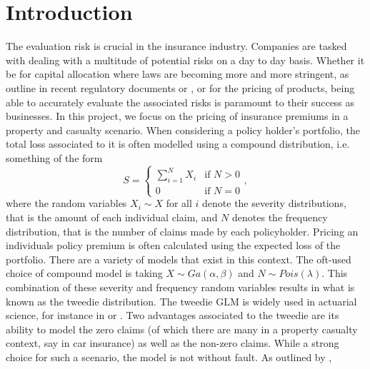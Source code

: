 \documentclass{article}
\numberwithin{equation}{section}
\begin{document}
\section{Introduction}
The evaluation risk is crucial in the insurance industry. Companies are tasked with dealing with a multitude of potential risks on a day to day basis. Whether it be for capital allocation where laws are becoming more and more stringent, as outline in recent regulatory documents   or \cite{OSFI2015}, or for the pricing of products, being able to accurately evaluate the associated risks is paramount to their success as businesses. In this project, we focus on the pricing of insurance premiums in a property and casualty scenario. When considering a policy holder's portfolio, the total loss associated to it is often modelled using a compound distribution, i.e. something of the form
$$
S=\left\{\begin{array}{ll}\sum_{i=1}^NX_i & \text{if }N>0\\0 & \text{if }N=0\end{array}\right.,
$$
where the random variables $X_i\sim X$ for all $i$ denote the severity distributions, that is the amount of each individual claim, and $N$ denotes the frequency distribution, that is the number of claims made by each policyholder. Pricing an individuals policy premium is often calculated using the expected loss of the portfolio. There are a variety of models that exist in this context. The oft-used choice of compound model is taking $X\sim Ga(\alpha,\beta)$ and $N\sim Pois(\lambda)$. This combination of these severity and frequency random variables results in what is known as the tweedie distribution. The tweedie GLM is widely used in actuarial science, for instance in \cite{murphy2000using} or \cite{peters2008model}. Two advantages associated to the tweedie are its ability to model the zero claims (of which there are many in a property casualty context, say in car insurance) as well as the non-zero claims.
While a strong choice for such a scenario, the model is not without fault. As outlined by \cite{yang2016insurance}, 


\end{document}
